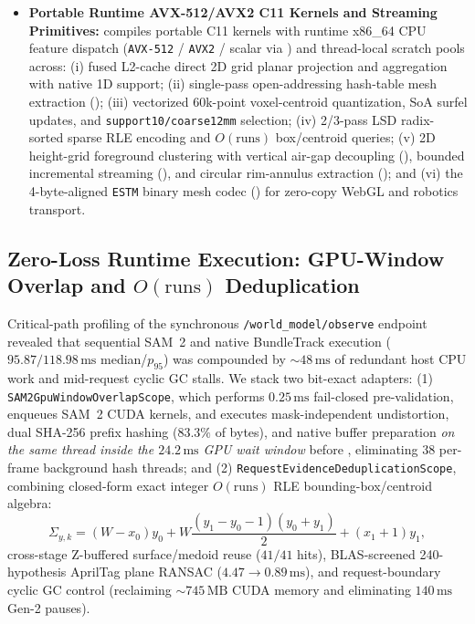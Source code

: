 \documentclass{evidencescene}
\begin{document}
\begin{itemize}
    \item \textbf{Portable Runtime AVX-512/AVX2 C11 Kernels and Streaming Primitives:}  compiles portable C11 kernels with runtime x86\_64 CPU feature dispatch (\texttt{AVX-512} / \texttt{AVX2} / scalar via ) and thread-local scratch pools across: (i) fused L2-cache direct 2D grid planar projection and aggregation with native 1D  support; (ii) single-pass open-addressing hash-table mesh extraction (); (iii) vectorized 60k-point voxel-centroid quantization, SoA surfel updates, and \texttt{support10/coarse12mm} selection; (iv) 2/3-pass LSD radix-sorted sparse RLE encoding and $O(\text{runs})$ box/centroid queries; (v) 2D height-grid foreground clustering with vertical air-gap decoupling (), bounded incremental streaming (), and circular rim-annulus extraction (); and (vi) the 4-byte-aligned \texttt{ESTM} binary mesh codec () for zero-copy WebGL and robotics transport.
\end{itemize}

\subsection{Zero-Loss Runtime Execution: GPU-Window Overlap and $O(\text{runs})$ Deduplication}
\label{sec:runtime_opt}
Critical-path profiling of the synchronous \texttt{/world\_model/observe} endpoint revealed that sequential SAM~2 and native BundleTrack execution ($95.87/118.98\,\mathrm{ms}$ median/$p_{95}$) was compounded by $\sim 48\,\mathrm{ms}$ of redundant host CPU work and mid-request cyclic GC stalls. We stack two bit-exact adapters: (1) \texttt{SAM2GpuWindowOverlapScope}, which performs $0.25\,\mathrm{ms}$ fail-closed pre-validation, enqueues SAM~2 CUDA kernels, and executes mask-independent undistortion, dual SHA-256 prefix hashing ($83.3\%$ of bytes), and native buffer preparation \emph{on the same thread inside the $24.2\,\mathrm{ms}$ GPU wait window} before , eliminating $38$ per-frame background hash threads; and (2) \texttt{RequestEvidenceDeduplicationScope}, combining closed-form exact integer $O(\text{runs})$ RLE bounding-box/centroid algebra:
\begin{equation}
    \Sigma_{y,k}=(W-x_0)y_0+W\frac{(y_1-y_0-1)(y_0+y_1)}{2}+(x_1+1)y_1,
    \label{eq:rle_sum_y}
\end{equation}
cross-stage Z-buffered surface/medoid reuse ($41/41$ hits), BLAS-screened 240-hypothesis AprilTag plane RANSAC ($4.47\to 0.89\,\mathrm{ms}$), and request-boundary cyclic GC control (reclaiming $\sim 745\,\mathrm{MB}$ CUDA memory and eliminating $140\,\mathrm{ms}$ Gen-2 pauses).
\end{document}
